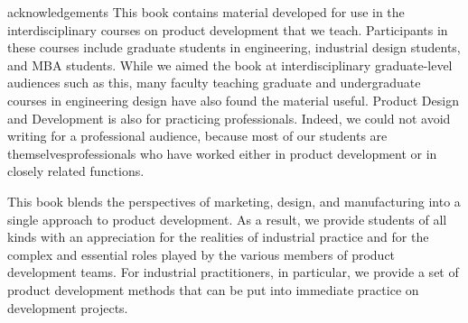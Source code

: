 %
%
%
%
%
%

\begin{acknowledgements}
acknowledgements  This book contains material developed for use 
in the interdisciplinary courses on product development that we teach. 
Participants in these courses include graduate students in engineering, 
industrial design students, and MBA students. While we 
aimed the book at interdisciplinary graduate-level audiences such 
as this, many faculty teaching graduate and undergraduate courses 
in engineering design have also found the material useful. Product 
Design and Development is also for practicing professionals. Indeed, 
we could not avoid writing  for  a  professional  audience,  
because  most  of  our  students  are  themselvesprofessionals who have worked 
either in product development or in closely related functions.

This book blends the perspectives of marketing, design, and manufacturing into 
a single approach to product development. As a result, we provide students 
of all kinds with an appreciation for the realities of industrial practice 
and for the complex and essential roles played by the various members of
product development teams. For industrial practitioners, in  particular,  
we  provide  a  set  of  product  development  methods  that  can  be  
put  into immediate practice on development projects.
\end{acknowledgements}
